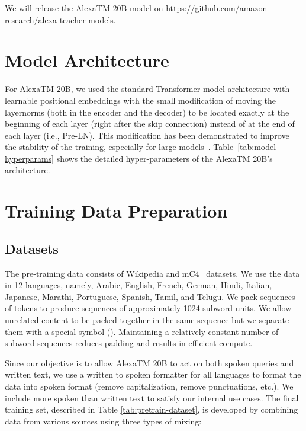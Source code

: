 We will release the {AlexaTM 20B} model on \url{https://github.com/amazon-research/alexa-teacher-models}.

\section{Model Architecture}
\label{sec:model-architecture}

For {AlexaTM 20B}, we used the standard Transformer model architecture \citep{Vaswani2017AttentionIA} with learnable positional embeddings with the small modification of moving the layernorms (both in the encoder and the decoder) to be located exactly at the beginning of each layer (right after the skip connection) instead of at the end of each layer (i.e., Pre-LN). This modification has been demonstrated to improve the stability of the training, especially for large models~\citep{Shoeybi2019MegatronLMTM,Xiong2020OnLN}. Table~\ref{tab:model-hyperparams} shows the detailed hyper-parameters of the {AlexaTM 20B}'s architecture.

\section{Training Data Preparation}
\label{sec:training-dataset}

\subsection{Datasets}

The pre-training data consists of Wikipedia and mC4~\citep{Xue2021mT5AM} datasets. We use the data in 12 languages, namely, Arabic, English, French, German, Hindi, Italian, Japanese, Marathi, Portuguese, Spanish, Tamil, and Telugu. We pack sequences of tokens to produce sequences of approximately 1024 subword units. We allow unrelated content to be packed together in the same sequence but we separate them with a special symbol ({\ttfamily [DOC]}). Maintaining a relatively constant number of subword sequences reduces padding and results in efficient compute. 

Since our objective is to allow {AlexaTM 20B} to act on both spoken queries and written text, we use a written to spoken formatter for all languages to format the data into spoken format (remove capitalization, remove punctuations, etc.). We include more spoken than written text to satisfy our internal use cases. The final training set, described in Table \ref{tab:pretrain-dataset}, is developed by combining data from various sources using three types of mixing:

